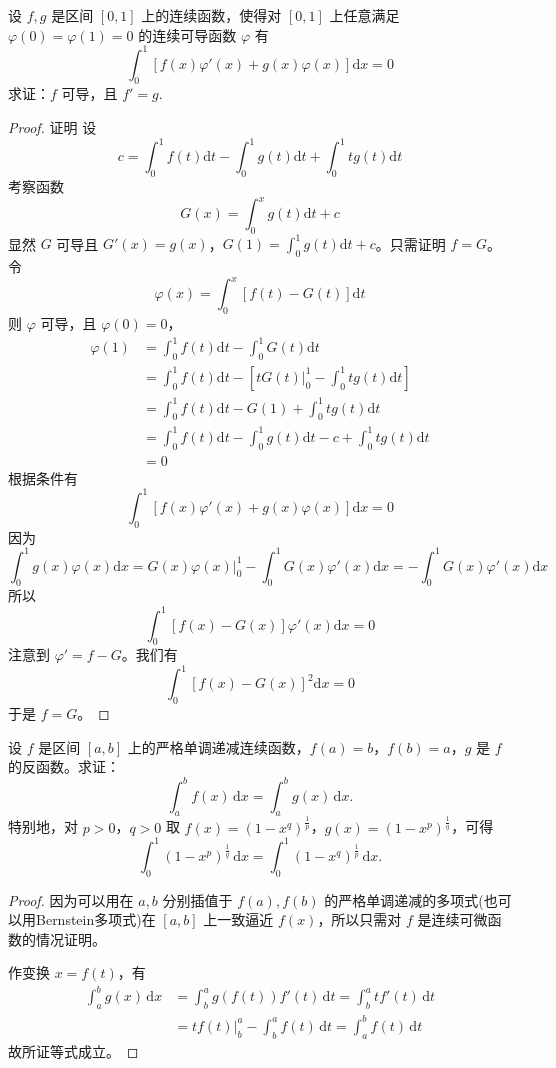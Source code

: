 \documentclass[../../main.tex]{subfiles}
\begin{document}
\begin{example}
设 \( f,g \) 是区间 \([0,1]\) 上的连续函数，使得对 \([0,1]\) 上任意满足 \( \varphi(0) = \varphi(1) = 0 \) 的连续可导函数 \( \varphi \) 有
\[
\int_{0}^{1} \left[ f(x)\varphi'(x) + g(x)\varphi(x) \right] \mathrm{d}x = 0
\]
求证：\( f \) 可导，且 \( f' = g \).
\end{example}
\begin{proof}
证明 设
\[
c = \int_{0}^{1} f(t)\mathrm{d}t - \int_{0}^{1} g(t)\mathrm{d}t + \int_{0}^{1} tg(t)\mathrm{d}t
\]
考察函数
\[
G(x) = \int_{0}^{x} g(t)\mathrm{d}t + c
\]
显然 \( G \) 可导且 \( G'(x) = g(x) \)，\( G(1) = \int_{0}^{1} g(t)\mathrm{d}t + c \)。只需证明 \( f = G \)。令
\[
\varphi(x) = \int_{0}^{x} \left[ f(t) - G(t) \right] \mathrm{d}t
\]
则 \( \varphi \) 可导，且 \( \varphi(0) = 0 \)，
\begin{align*}
\varphi(1) &= \int_{0}^{1} f(t)\mathrm{d}t - \int_{0}^{1} G(t)\mathrm{d}t \\
&= \int_{0}^{1} f(t)\mathrm{d}t - \left[ tG(t)\big|_{0}^{1} - \int_{0}^{1} tg(t)\mathrm{d}t \right] \\
&= \int_{0}^{1} f(t)\mathrm{d}t - G(1) + \int_{0}^{1} tg(t)\mathrm{d}t \\
&= \int_{0}^{1} f(t)\mathrm{d}t - \int_{0}^{1} g(t)\mathrm{d}t - c + \int_{0}^{1} tg(t)\mathrm{d}t \\
&= 0
\end{align*}
根据条件有
\[
\int_{0}^{1} \left[ f(x)\varphi'(x) + g(x)\varphi(x) \right] \mathrm{d}x = 0
\]
因为
\[
\int_{0}^{1} g(x)\varphi(x)\mathrm{d}x = G(x)\varphi(x)\big|_{0}^{1} - \int_{0}^{1} G(x)\varphi'(x)\mathrm{d}x = -\int_{0}^{1} G(x)\varphi'(x)\mathrm{d}x
\]
所以
\[
\int_{0}^{1} \left[ f(x) - G(x) \right] \varphi'(x)\mathrm{d}x = 0
\]
注意到 \( \varphi' = f - G \)。我们有
\[
\int_{0}^{1} \left[ f(x) - G(x) \right]^{2} \mathrm{d}x = 0
\]
于是 \( f = G \)。
\end{proof}

\begin{proposition}
设 \( f \) 是区间 \([a,b]\) 上的严格单调递减连续函数，\( f(a) = b \)，\( f(b) = a \)，\( g \) 是 \( f \) 的反函数。求证：
\[
\int_{a}^{b} f(x) \, \mathrm{d}x = \int_{a}^{b} g(x) \, \mathrm{d}x.
\]
特别地，对 \( p > 0 \)，\( q > 0 \) 取 \( f(x) = (1 - x^{q})^{\frac{1}{p}} \)，\( g(x) = (1 - x^{p})^{\frac{1}{q}} \)，可得
\[
\int_{0}^{1} (1 - x^{p})^{\frac{1}{q}} \, \mathrm{d}x = \int_{0}^{1} (1 - x^{q})^{\frac{1}{p}} \, \mathrm{d}x.
\]
\end{proposition}
\begin{proof}
因为可以用在 \( a,b \) 分别插值于 \( f(a),f(b) \) 的严格单调递减的多项式(也可以用Bernstein多项式)在 \([a,b]\) 上一致逼近 \( f(x) \)，所以只需对 \( f \) 是连续可微函数的情况证明。

作变换 \( x = f(t) \)，有
\begin{align*}
\int_{a}^{b} g(x) \, \mathrm{d}x &= \int_{b}^{a} g(f(t))f'(t) \, \mathrm{d}t = \int_{b}^{a} t f'(t) \, \mathrm{d}t \\
&= t f(t) \Big |_{b}^{a} - \int_{b}^{a} f(t) \, \mathrm{d}t = \int_{a}^{b} f(t) \, \mathrm{d}t
\end{align*}
故所证等式成立。
\end{proof}
\end{document}
